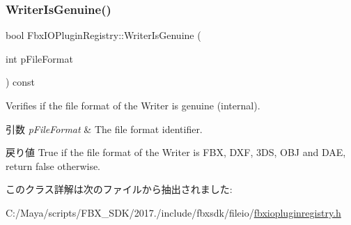 \subsubsection{\texorpdfstring{Writer\+Is\+Genuine()}{WriterIsGenuine()}}
{\footnotesize\ttfamily bool Fbx\+I\+O\+Plugin\+Registry\+::\+Writer\+Is\+Genuine (\begin{DoxyParamCaption}\item[{int}]{p\+File\+Format }\end{DoxyParamCaption}) const}

Verifies if the file format of the Writer is genuine (internal). 
\begin{DoxyParams}{引数}
{\em p\+File\+Format} & The file format identifier. \\
\hline
\end{DoxyParams}
\begin{DoxyReturn}{戻り値}
{\ttfamily True} if the file format of the Writer is F\+BX, D\+XF, 3\+DS, O\+BJ and D\+AE, return {\ttfamily false} otherwise. 
\end{DoxyReturn}


このクラス詳解は次のファイルから抽出されました\+:\begin{DoxyCompactItemize}
\item 
C\+:/\+Maya/scripts/\+F\+B\+X\+\_\+\+S\+D\+K/2017./include/fbxsdk/fileio/\hyperlink{fbxiopluginregistry_8h}{fbxiopluginregistry.\+h}\end{DoxyCompactItemize}
